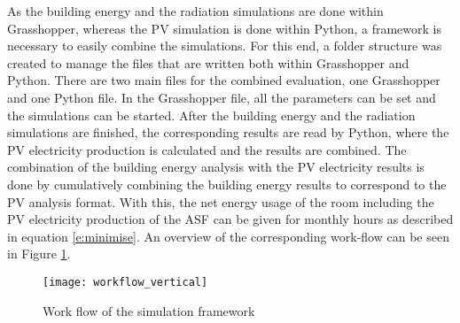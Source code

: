 
			As the building energy and the radiation simulations are done within Grasshopper, whereas the PV simulation is done within Python, a framework is necessary to easily combine the simulations. For this end, a folder structure was created to manage the files that are written both within Grasshopper and Python. There are two main files for the combined evaluation, one Grasshopper and one Python file. In the Grasshopper file, all the parameters can be set and the simulations can be started. After the building energy and the radiation simulations are finished, the corresponding results are read by Python, where the PV electricity production is calculated and the results are combined. The combination of the building energy analysis with the PV electricity results is done by cumulatively combining the building energy results to correspond to the PV analysis format. With this, the net energy usage of the room including the PV electricity production of the ASF can be given for monthly hours as described in equation \ref{e:minimise}. An overview of the corresponding work-flow can be seen in Figure \ref{fig:workflow}. 

			\begin{figure}[ht] %
				\begin{center}
				\texttt{[image: workflow\_vertical]}
				\caption{Work flow of the simulation framework}
				\label{fig:workflow}
				\end{center} 
			\end{figure}

